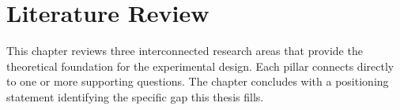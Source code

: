 
\chapter{Literature Review}
\label{ch:literature-review}

This chapter reviews three interconnected research areas that provide the theoretical foundation for the experimental design. Each pillar connects directly to one or more supporting questions. The chapter concludes with a positioning statement identifying the specific gap this thesis fills.





